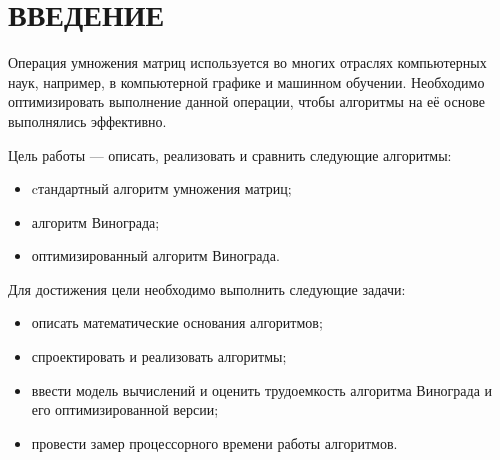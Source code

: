 \chapter*{ВВЕДЕНИЕ}

Операция умножения матриц используется во многих отраслях компьютерных наук, например, в компьютерной графике и машинном обучении. Необходимо оптимизировать выполнение данной операции, чтобы алгоритмы на её основе выполнялись эффективно.

Цель работы — описать, реализовать и сравнить следующие алгоритмы:
\begin{itemize}[label=--]
\label{lst:algorithms}
    \item cтандартный алгоритм умножения матриц;
    \item алгоритм Винограда;
    \item оптимизированный алгоритм Винограда.
\end{itemize}

Для достижения цели необходимо выполнить следующие задачи:
\begin{itemize}[label=--]
    \item описать математические основания алгоритмов;
    \item спроектировать и реализовать алгоритмы;
    \item ввести модель вычислений и оценить трудоемкость алгоритма Винограда и его оптимизированной версии;
    \item провести замер процессорного времени работы алгоритмов.
\end{itemize}

